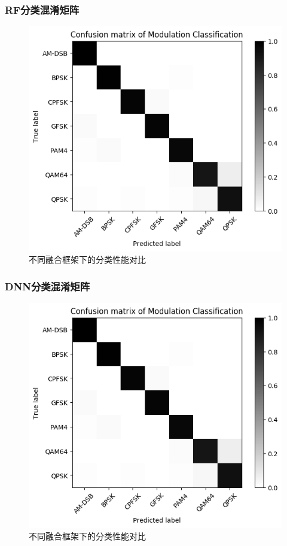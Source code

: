\subsubsection{RF分类混淆矩阵}
\begin{figure}[!h]
	\centering
	\includegraphics[scale=0.7]{figures/chapter_4/fig_4_6}
	\caption{不同融合框架下的分类性能对比}\label{sec:fig_4_6}
\end{figure}
\subsubsection{DNN分类混淆矩阵}
\begin{figure}[!h]
	\centering
	\includegraphics[scale=0.7]{figures/chapter_4/fig_4_7}
	\caption{不同融合框架下的分类性能对比}\label{sec:fig_4_7}
\end{figure}
